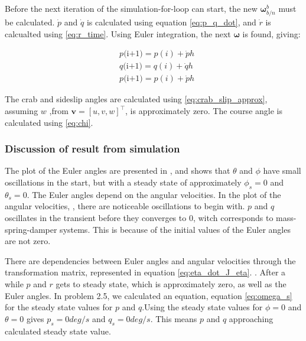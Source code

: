 Before the next iteration of the simulation-for-loop can start, the new $\boldsymbol{\omega}^b_{b/n}$ must be calculated. $\dot{p}$ and $\dot{q}$ is calculated using equation \eqref{eq:p_q_dot}, and $\dot{r}$ is calcualted using \eqref{eq:r_time}. Using Euler integration, the next $\boldsymbol{\omega}$ is found, giving:

\begin{equation}
\begin{aligned}
	& p\text{(i+1)} = p(i) + \dot{p} h \\
	& q\text{(i+1)} = q(i) + \dot{q} h \\
	& p \text{(i+1)} = p(i) + \dot{p} h
\end{aligned}
\end{equation}

The crab and sideslip angles are calculated using \eqref{eq:crab_slip_approx}, assuming  $w$ ,from $\mathbf{v} =[u,v,w]^\top$, is approximately zero. The course angle is calculated using \eqref{eq:chi}.


\subsubsection*{Discussion of result from simulation}

The plot of the Euler angles are presented in , and shows that $\theta$ and $\phi$ have small oscillations in the start, but with a steady state of approximately $\phi_s = 0$ and $\theta_s = 0$. The Euler angles depend on the angular velocities. In the plot of the angular velocities, , there are noticeable oscillations to begin with. $p$ and $q$ oscillates in the transient before they
converges to 0, witch corresponds to mass-spring-damper systems. This is because of the initial values of the Euler angles are not zero.

There are dependencies between Euler angles and angular velocities through the transformation matrix, represented in equation \eqref{eq:eta_dot_J_eta}.  . After a while $p$ and $r$ gets to steady state, which is approximately zero, as well as the Euler angles. In problem 2.5, we calculated an equation, equation \eqref{eq:omega_s} for the steady state values for $p$ and $q$.Using the steady state values for $\phi = 0$ and $\theta = 0$ gives $p_s = 0 deg/s$ and  $q_s = 0 deg/s$. This means $p$ and $q$ approaching calculated   steady state value.  

